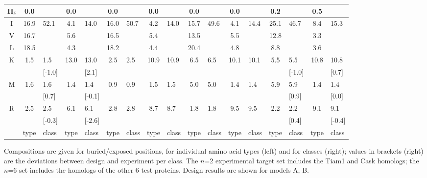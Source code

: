 \documentclass[12pt]{article}
\newcommand{\fn}{\footnotesize}
\begin{document}
\begin{table}
\begin{tabular}{c|clcl|clcl|clcl|clcl}
H$_{\delta}$ & 0.0 & & 0.0 & & 0.0 & & 0.0 & & 0.0 & & 0.0 & & 0.2 & & 0.5 & \\
\hline
I & 16.9 & \multirow{2}{*}{52.1} & 4.1 & \multirow{2}{*}{14.0} & 16.0 & \multirow{3}{*}{50.7} & 4.2 & \multirow{3}{*}{14.0} & 15.7 & \multirow{3}{*}{49.6} 
    & 4.1 & \multirow{3}{*}{14.4} & 25.1 & \multirow{2}{*}{46.7} & 8.4 & \multirow{2}{*}{15.3}\\
V & 16.7 & \multirow{2}{*}{[1.4]} & 5.6 & \multirow{2}{*}{[0.0]} & 16.5 & & 5.4 & & 13.5 & & 5.5 & & 12.8 & \multirow{2}{*}{[-2.9]} & 3.3 & \multirow{2}{*}{[0.9]}\\
L & 18.5 & & 4.3 & & 18.2 & & 4.4 & & 20.4 & & 4.8 & & 8.8 & & 3.6 & \\
\hline
\multirow{2}{*}{K} & \multirow{2}{*}{1.5} & 1.5 & \multirow{2}{*}{13.0} & 13.0 & \multirow{2}{*}{2.5} & \multirow{2}{*}{2.5} & \multirow{2}{*}{10.9} 
  & \multirow{2}{*}{10.9} & \multirow{2}{*}{6.5} & \multirow{2}{*}{6.5} & \multirow{2}{*}{10.1} & \multirow{2}{*}{10.1} & \multirow{2}{*}{5.5} & 5.5 
  & \multirow{2}{*}{10.8} & 10.8\\
 & & [-1.0] & & [2.1] & & & & & & & & & & [-1.0] & & [0.7]\\
\hline
\multirow{2}{*}{M} & \multirow{2}{*}{1.6} & 1.6 & \multirow{2}{*}{1.4} & 1.4 & \multirow{2}{*}{0.9} & \multirow{2}{*}{0.9} & \multirow{2}{*}{1.5} 
 & \multirow{2}{*}{1.5} & \multirow{2}{*}{5.0} & \multirow{2}{*}{5.0} & \multirow{2}{*}{1.4} & \multirow{2}{*}{1.4} & \multirow{2}{*}{5.9} & 5.9 
 & \multirow{2}{*}{1.4} & 1.4\\
 & & [0.7] & & [-0.1] & & & & & & & & & & [0.9] & & [0.0]\\
\hline
\multirow{2}{*}{R} & \multirow{2}{*}{2.5} & 2.5 & \multirow{2}{*}{6.1} & 6.1 & \multirow{2}{*}{2.8} & \multirow{2}{*}{2.8} & \multirow{2}{*}{8.7} 
 & \multirow{2}{*}{8.7} & \multirow{2}{*}{1.8} & \multirow{2}{*}{1.8} & \multirow{2}{*}{9.5} & \multirow{2}{*}{9.5} & \multirow{2}{*}{2.2} & 2.2 
 & \multirow{2}{*}{9.1} & 9.1\\
 & & [-0.3] & & [-2.6] & & & & & & & & & & [0.4] & & [-0.4]\\ \hline
 & \fn{type} & \fn{class} & \fn{type} & \fn{class} & \fn{type} & \fn{class} & \fn{type} & \fn{class} 
 & \fn{type} & \fn{class} & \fn{type} & \fn{class} & \fn{type} & \fn{class} & \fn{type} & \fn{class} \\ \hline
\end{tabular} 
{\footnotesize \noindent Compositions are given for buried/exposed positions, for individual amino acid types (left) and for classes
(right); values in brackets (right) are the deviations between design and experiment per class. The $n$=2 experimental target set
includes the Tiam1 and Cask homologs; the $n$=6 set includes the homologs of the other 6 test proteins. Design results are shown for
models A, B.
}
\end{table}
\end{document}
